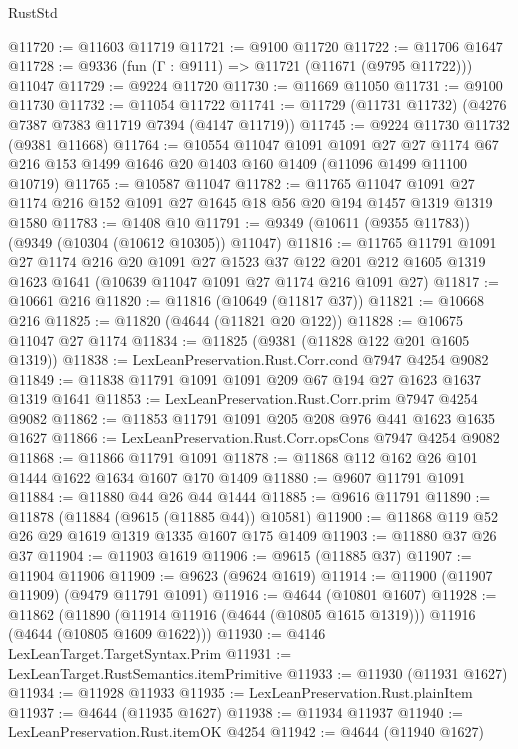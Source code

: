 \begin{lexlean}{RustStd}
\begin{coremodule}
@11720 := @11603 @11719
@11721 := @9100 @11720
@11722 := @11706 @1647
@11728 := @9336 (fun (Γ : @9111) => @11721 (@11671 (@9795 @11722))) @11047
@11729 := @9224 @11720
@11730 := @11669 @11050
@11731 := @9100 @11730
@11732 := @11054 @11722
@11741 := @11729 (@11731 @11732) (@4276 @7387 @7383 @11719 @7394 (@4147 @11719))
@11745 := @9224 @11730 @11732 (@9381 @11668)
@11764 := @10554
    @11047
    @1091
    @1091
    @27
    @27
    @1174
    @67
    @216
    @153
    @1499
    @1646
    @20
    @1403
    @160
    @1409
    (@11096 @1499 @11100 @10719)
@11765 := @10587 @11047
@11782 := @11765
    @11047
    @1091
    @27
    @1174
    @216
    @152
    @1091
    @27
    @1645
    @18
    @56
    @20
    @194
    @1457
    @1319
    @1319
    @1580
@11783 := @1408 @10
@11791 := @9349 (@10611 (@9355 @11783)) (@9349 (@10304 (@10612 @10305)) @11047)
@11816 := @11765
    @11791
    @1091
    @27
    @1174
    @216
    @20
    @1091
    @27
    @1523
    @37
    @122
    @201
    @212
    @1605
    @1319
    @1623
    @1641
    (@10639 @11047 @1091 @27 @1174 @216 @1091 @27)
@11817 := @10661 @216
@11820 := @11816 (@10649 (@11817 @37))
@11821 := @10668 @216
@11825 := @11820 (@4644 (@11821 @20 @122))
@11828 := @10675 @11047 @27 @1174
@11834 := @11825 (@9381 (@11828 @122 @201 @1605 @1319))
@11838 := LexLeanPreservation.Rust.Corr.cond @7947 @4254 @9082
@11849 := @11838 @11791 @1091 @1091 @209 @67 @194 @27 @1623 @1637 @1319 @1641
@11853 := LexLeanPreservation.Rust.Corr.prim @7947 @4254 @9082
@11862 := @11853 @11791 @1091 @205 @208 @976 @441 @1623 @1635 @1627
@11866 := LexLeanPreservation.Rust.Corr.opsCons @7947 @4254 @9082
@11868 := @11866 @11791 @1091
@11878 := @11868 @112 @162 @26 @101 @1444 @1622 @1634 @1607 @170 @1409
@11880 := @9607 @11791 @1091
@11884 := @11880 @44 @26 @44 @1444
@11885 := @9616 @11791
@11890 := @11878 (@11884 (@9615 (@11885 @44)) @10581)
@11900 := @11868 @119 @52 @26 @29 @1619 @1319 @1335 @1607 @175 @1409
@11903 := @11880 @37 @26 @37
@11904 := @11903 @1619
@11906 := @9615 (@11885 @37)
@11907 := @11904 @11906
@11909 := @9623 (@9624 @1619)
@11914 := @11900 (@11907 @11909) (@9479 @11791 @1091)
@11916 := @4644 (@10801 @1607)
@11928 := @11862
    (@11890 (@11914 @11916 (@4644 (@10805 @1615 @1319))) @11916 (@4644 (@10805 @1609 @1622)))
@11930 := @4146 LexLeanTarget.TargetSyntax.Prim
@11931 := LexLeanTarget.RustSemantics.itemPrimitive
@11933 := @11930 (@11931 @1627)
@11934 := @11928 @11933
@11935 := LexLeanPreservation.Rust.plainItem
@11937 := @4644 (@11935 @1627)
@11938 := @11934 @11937
@11940 := LexLeanPreservation.Rust.itemOK @4254
@11942 := @4644 (@11940 @1627)

\end{coremodule}
\end{lexlean}
